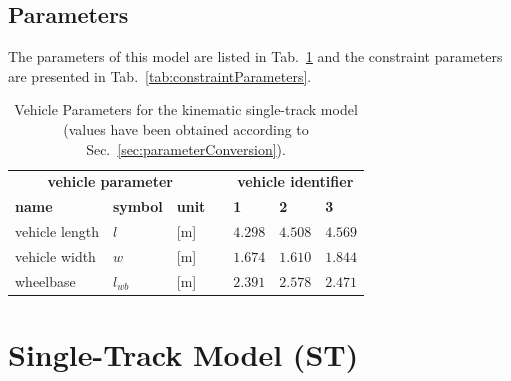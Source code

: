 \documentclass[11pt,a4paper]{article}
\renewcommand{\^}[1]{^{(#1)}}
\begin{document}
\subsection{Parameters}

The parameters of this model are listed in Tab.~\ref{tab:vehicleParametersKS} and the constraint parameters are presented in Tab.~\ref{tab:constraintParameters}.


\begin{table}[h]
\caption{Vehicle Parameters for the kinematic single-track model (values have been obtained according to Sec.~\ref{sec:parameterConversion}). }
{\small
\begin{center}\label{tab:vehicleParametersKS}
\begin{tabular}{lllclll}
	\toprule
	\multicolumn{3}{c}{\textbf{vehicle parameter}} & \phantom{a} & \multicolumn{3}{c}{\textbf{vehicle identifier}} \\ \cmidrule{1-3} \cmidrule{5-7} 
	\textbf{name} & \textbf{symbol} & \textbf{unit} && \textbf{1} & \textbf{2} & \textbf{3}  \\ \hline
	vehicle length & $l$ & [m] && $4.298$ & $4.508$ & $4.569$ \\
	vehicle width & $w$ & [m] && $1.674$ & $1.610$ & $1.844$ \\
	wheelbase & $l_{wb}$ & [m] && $2.391$ & $2.578$ & $2.471$ \\ 
	\bottomrule %
\end{tabular}
\end{center}}
\end{table}





\section{Single-Track Model (ST)} \label{sec:STmodel} 
\end{document}

